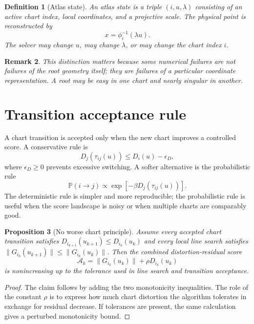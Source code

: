 \documentclass[11pt]{article}
\newtheorem{definition}{Definition}[section]
\newtheorem{proposition}[definition]{Proposition}
\newtheorem{remark}[definition]{Remark}
\begin{document}
\begin{definition}[Atlas state]
An atlas state is a triple $(i,u,\lambda)$ consisting of an active chart index, local coordinates, and a projective scale.  The physical point is reconstructed by
\[
        x=\phi_i^{-1}(\lambda u).
\]
The solver may change $u$, may change $\lambda$, or may change the chart index $i$.
\end{definition}

\begin{remark}
This distinction matters because some numerical failures are not failures of the root geometry itself; they are failures of a particular coordinate representation.  A root may be easy in one chart and nearly singular in another.
\end{remark}

\section{Transition acceptance rule}
A chart transition is accepted only when the new chart improves a controlled score.  A conservative rule is
\[
        D_j(\tau_{ij}(u)) \le D_i(u)-\epsilon_D,
\]
where $\epsilon_D\ge 0$ prevents excessive switching.  A softer alternative is the probabilistic rule
\[
        \mathbb P(i\to j)\propto \exp[-\beta D_j(\tau_{ij}(u))].
\]
The deterministic rule is simpler and more reproducible; the probabilistic rule is useful when the score landscape is noisy or when multiple charts are comparably good.

\begin{proposition}[No worse chart principle]
Assume every accepted chart transition satisfies $D_{i_{k+1}}(u_{k+1})\le D_{i_k}(u_k)$ and every local line search satisfies $\|G_{i_k}(u_{k+1})\|\le \|G_{i_k}(u_k)\|$.  Then the combined distortion-residual score
\[
        \mathcal A_k=\|G_{i_k}(u_k)\|+\rho D_{i_k}(u_k)
\]
is nonincreasing up to the tolerance used in line search and transition acceptance.
\end{proposition}
\begin{proof}
The claim follows by adding the two monotonicity inequalities.  The role of the constant $\rho$ is to express how much chart distortion the algorithm tolerates in exchange for residual decrease.  If tolerances are present, the same calculation gives a perturbed monotonicity bound.
\end{proof}
\end{document}
